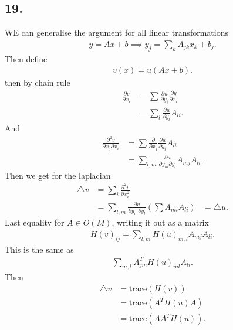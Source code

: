 \subsection*{19.}
WE can generalise the argument for all linear transformations
\begin{align*}
  y = Ax +b   \implies y_j = \sum_{k}A_{jk}x_k + b_j
.\end{align*}
Then define 
\begin{align*}
  v(x) = u(Ax +b)
.\end{align*}
then by chain rule 
\begin{align*}
  \frac{\partial v}{\partial x_i}  &= \sum \frac{\partial u}{\partial y_{i}} \frac{\partial y}{\partial x_i}  \\
                                   &= \sum_{l} \frac{\partial u}{\partial y_l}  A_{li}
.\end{align*}
And 
\begin{align*}
  \frac{\partial ^2 v}{\partial x_j \partial x_i}  &= \sum \frac{\partial }{\partial x_j}  \frac{\partial u}{\partial y_{i}} A_{li} \\   
                                                   &= \sum_{l,m} \frac{\partial u}{\partial y_m \partial y_l}  A_{mj}A_{li}
.\end{align*}
Then we get for the laplacian
\begin{align*}
  \triangle v &= \sum_{i} \frac{\partial ^2 v}{\partial x_i^2}  \\
              &= \sum_{l,m} \frac{\partial u}{\partial y_m \partial y_l } (\sum A_{mi} A_{li})
              &= \triangle u 
.\end{align*}
Last equality for $A \in  O(M)$, writing it out as a matrix 
\begin{align*}
  H(v)_{ij} = \sum_{l,m} H(u)_{m,l}A_{mj}A_{li}
.\end{align*}
This is the same  as 
\begin{align*}
  \sum_{m,l} A_{jm}^{T} H(u)_{ml} A_{li}
.\end{align*}
Then 
\begin{align*}
  \triangle v &= \text{trace}(H(v)) \\
              &= \text{trace}(A^{T}H(u)A ) \\
              &= \text{trace}(A A^{T}H(u) )
.\end{align*}
